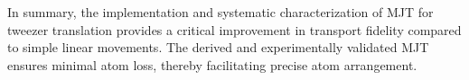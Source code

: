 In summary, the implementation and systematic characterization of MJT for tweezer translation provides a critical improvement in transport fidelity compared to simple linear movements. The derived and experimentally validated MJT ensures minimal atom loss, thereby facilitating precise atom arrangement. 

